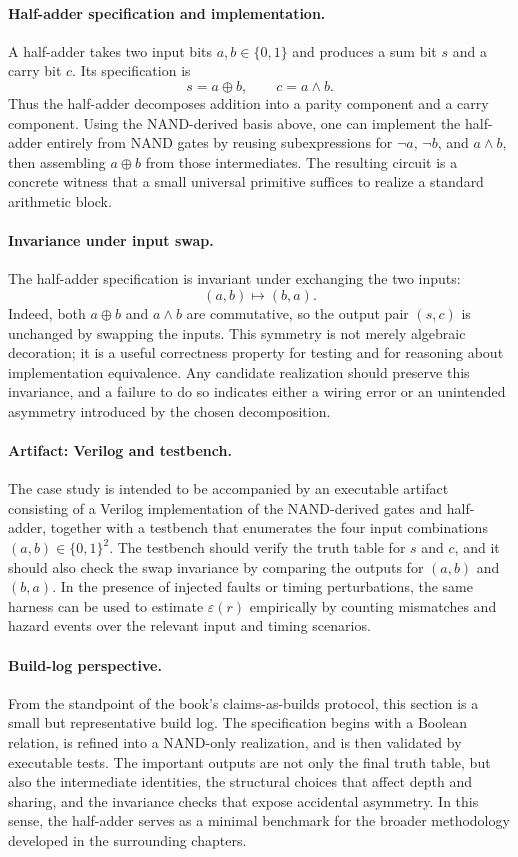\documentclass[11pt]{article}
\begin{document}
\paragraph{Half-adder specification and implementation.}
A half-adder takes two input bits \(a,b \in \{0,1\}\) and produces a sum bit \(s\) and a carry bit \(c\). Its specification is
\[
 s = a \oplus b, \qquad c = a \wedge b.
\]
Thus the half-adder decomposes addition into a parity component and a carry component. Using the NAND-derived basis above, one can implement the half-adder entirely from NAND gates by reusing subexpressions for \(\neg a\), \(\neg b\), and \(a \wedge b\), then assembling \(a \oplus b\) from those intermediates. The resulting circuit is a concrete witness that a small universal primitive suffices to realize a standard arithmetic block.

\paragraph{Invariance under input swap.}
The half-adder specification is invariant under exchanging the two inputs:
\[
(a,b) \mapsto (b,a).
\]
Indeed, both \(a \oplus b\) and \(a \wedge b\) are commutative, so the output pair \((s,c)\) is unchanged by swapping the inputs. This symmetry is not merely algebraic decoration; it is a useful correctness property for testing and for reasoning about implementation equivalence. Any candidate realization should preserve this invariance, and a failure to do so indicates either a wiring error or an unintended asymmetry introduced by the chosen decomposition.

\paragraph{Artifact: Verilog and testbench.}
The case study is intended to be accompanied by an executable artifact consisting of a Verilog implementation of the NAND-derived gates and half-adder, together with a testbench that enumerates the four input combinations \((a,b) \in \{0,1\}^2\). The testbench should verify the truth table for \(s\) and \(c\), and it should also check the swap invariance by comparing the outputs for \((a,b)\) and \((b,a)\). In the presence of injected faults or timing perturbations, the same harness can be used to estimate \(\varepsilon(r)\) empirically by counting mismatches and hazard events over the relevant input and timing scenarios.

\paragraph{Build-log perspective.}
From the standpoint of the book's claims-as-builds protocol, this section is a small but representative build log. The specification begins with a Boolean relation, is refined into a NAND-only realization, and is then validated by executable tests. The important outputs are not only the final truth table, but also the intermediate identities, the structural choices that affect depth and sharing, and the invariance checks that expose accidental asymmetry. In this sense, the half-adder serves as a minimal benchmark for the broader methodology developed in the surrounding chapters.
\end{document}
